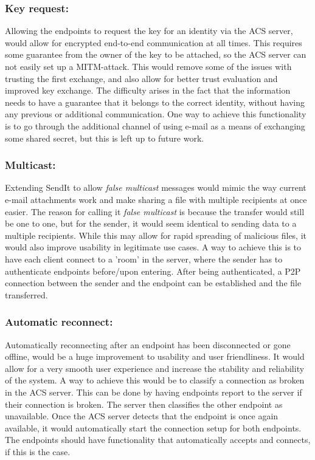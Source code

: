 \subsubsection*{Key request:}
Allowing the endpoints to request the key for an identity via the ACS server, would allow for encrypted end-to-end communication at all times. This requires some guarantee from the owner of the key to be attached, so the ACS server can not easily set up a MITM-attack. This would remove some of the issues with trusting the first exchange, and also allow for better trust evaluation and improved key exchange. The difficulty arises in the fact that the information needs to have a guarantee that it belongs to the correct identity, without having any previous or additional communication. One way to achieve this functionality is to go through the additional channel of using e-mail as a means of exchanging some shared secret, but this is left up to future work.
%
\subsubsection*{Multicast:}
Extending SendIt to allow \emph{false multicast} messages would mimic the way current e-mail attachments work and make sharing a file with multiple recipients at once easier. The reason for calling it \emph{false multicast} is because the transfer would still be one to one, but for the sender, it would seem identical to sending data to a multiple recipients. While this may allow for rapid spreading of malicious files, it would also improve usability in legitimate use cases. A way to achieve this is to have each client connect to a 'room' in the server, where the sender has to authenticate endpoints before/upon entering. After being authenticated, a P2P connection between the sender and the endpoint can be established and the file transferred.
%
\subsubsection*{Automatic reconnect:}
Automatically reconnecting after an endpoint has been disconnected or gone offline, would be a huge improvement to usability and user friendliness. It would allow for a very smooth user experience and increase the stability and reliability of the system. A way to achieve this would be to classify a connection as broken in the ACS server. This can be done by having endpoints report to the server if their connection is broken. The server then classifies the other endpoint as unavailable. Once the ACS server detects that the endpoint is once again available, it would automatically start the connection setup for both endpoints. The endpoints should have functionality that automatically accepts and connects, if this is the case.
%
